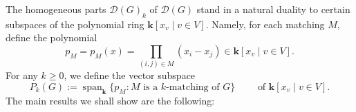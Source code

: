 \documentclass[12pt]{amsart}
\theoremstyle{definition}
\theoremstyle{remark}
\newcommand{\kk}{\mathbf{k}}
\newcommand{\Span}{\operatorname{span}}
\begin{document}
The homogeneous parts $\mathcal D(G)_k$ of $\mathcal D(G)$
stand in a natural duality to certain subspaces of the polynomial ring
$\kk[x_v \mid  v\in V]$.
Namely, for each matching $M$, define the polynomial
\[
  p_M = p_M(x)=\prod_{(i,j) \in M}(x_i-x_j) \in \kk[x_v \mid  v\in V].
\]
For any $k \geq 0$, we define the vector subspace
\[
  P_k(G):=\Span_\kk\{p_M:M\text{ is a $k$-matching of $G$}\}
  \qquad \text{ of } \kk[x_v \mid  v\in V].
\]
The main results we shall show are the following:
\end{document}
